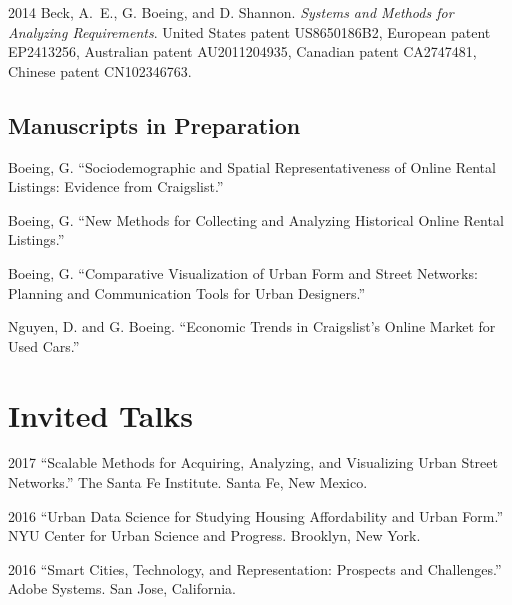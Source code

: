 \documentclass{academiccv}
\begin{document}
\begin{tablist}

\item[2014] \tab Beck, A.~E., G. Boeing, and D. Shannon. \emph{Systems and Methods for Analyzing Requirements}. United States patent US8650186B2, European patent EP2413256, Australian patent AU2011204935, Canadian patent CA2747481, Chinese patent CN102346763.

\end{tablist}



\subsection*{Manuscripts in Preparation}

\begin{tablist}

\item[\the\year] \tab Boeing, G. \enquote{Sociodemographic and Spatial Representativeness of Online Rental Listings: Evidence from Craigslist.}

\item[\the\year] \tab Boeing, G. \enquote{New Methods for Collecting and Analyzing Historical Online Rental Listings.}

\item[\the\year] \tab Boeing, G. \enquote{Comparative Visualization of Urban Form and Street Networks: Planning and Communication Tools for Urban Designers.}

\item[\the\year] \tab Nguyen, D. and G. Boeing. \enquote{Economic Trends in Craigslist's Online Market for Used Cars.}

\end{tablist}



\section*{Invited Talks}

\begin{tablist}

\item[2017] \tab \enquote{Scalable Methods for Acquiring, Analyzing, and Visualizing Urban Street Networks.} The Santa Fe Institute. Santa Fe, New Mexico.

\item[2016] \tab \enquote{Urban Data Science for Studying Housing Affordability and Urban Form.} NYU Center for Urban Science and Progress. Brooklyn, New York.

\item[2016] \tab \enquote{Smart Cities, Technology, and Representation: Prospects and Challenges.} Adobe Systems. San Jose, California.

\end{tablist}
\end{document}
